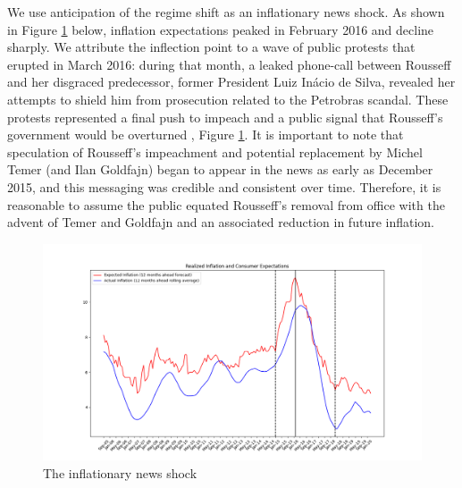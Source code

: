 \documentclass[12pt]{article}
\begin{document}
			 We use anticipation of the regime shift as an inflationary news shock. As shown in Figure \ref{fig:Inflation} below, inflation expectations peaked in February 2016 and decline sharply. We attribute the inflection point to a wave of public protests that erupted in March 2016: during that month, a leaked phone-call between Rousseff and her disgraced predecessor, former President Luiz Inácio de Silva, revealed her attempts to shield him from prosecution related to the Petrobras scandal. These protests represented a final push to impeach and a public signal that Rousseff's government would be overturned \cite{douglasReleaseTappedPhone2016}, Figure \ref{fig:Inflation}. It is important to note that speculation of Rousseff's impeachment and potential replacement by Michel Temer (and Ilan Goldfajn) began to appear in the news as early as December 2015, and this messaging was credible and consistent over time. Therefore, it is reasonable to assume the public equated Rousseff's removal from office with the advent of Temer and Goldfajn and an associated reduction in future inflation. 
			 
			\begin{figure}[!ht]
			\centering
			\includegraphics[scale = .5]{tables-figures/Realized_Inflation_and_Consumer_Expectations.png}
			\caption{The inflationary news shock}
			\label{fig:Inflation}
			\end{figure}
			
\end{document}
